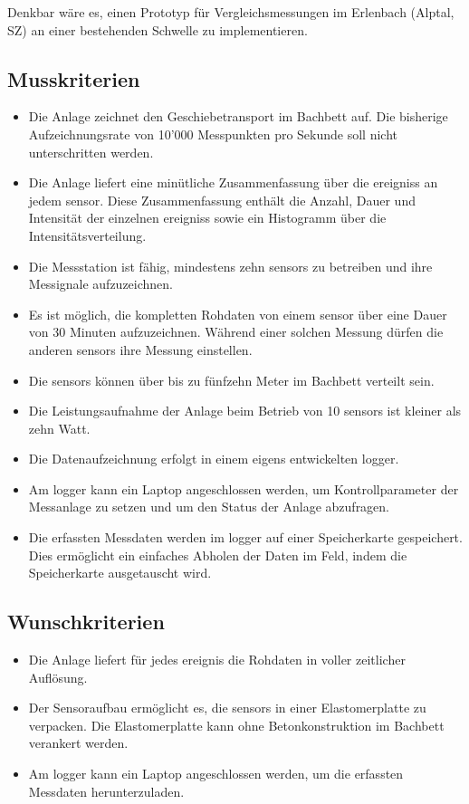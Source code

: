 Denkbar wäre es, einen Prototyp für Vergleichsmessungen im Erlenbach (Alptal, SZ) an einer bestehenden Schwelle zu implementieren.


\subsection{Musskriterien}
\begin{itemize}
\item Die Anlage zeichnet den Geschiebetransport im Bachbett auf. Die bisherige Aufzeichnungsrate von 10'000 Messpunkten pro Sekunde soll nicht unterschritten werden.
\item Die Anlage liefert eine minütliche Zusammenfassung über die \glspl{ereignis} an jedem \gls{sensor}. Diese Zusammenfassung enthält die Anzahl, Dauer und Intensität der einzelnen \glspl{ereignis} sowie ein Histogramm über die Intensitätsverteilung.
\item Die Messstation ist fähig, mindestens zehn \glspl{sensor} zu betreiben und ihre Messignale aufzuzeichnen.
\item Es ist möglich, die kompletten Rohdaten von einem \gls{sensor} über eine Dauer von 30 Minuten aufzuzeichnen. Während einer solchen Messung dürfen die anderen \glspl{sensor} ihre Messung einstellen.
\item Die \glspl{sensor} können über bis zu fünfzehn Meter im Bachbett verteilt sein.
\item Die Leistungsaufnahme der Anlage beim Betrieb von 10 \glspl{sensor} ist kleiner als zehn Watt.
\item Die Datenaufzeichnung erfolgt in einem eigens entwickelten \gls{logger}.
\item Am \gls{logger} kann ein Laptop angeschlossen werden, um Kontrollparameter der Messanlage zu setzen und um den Status der Anlage abzufragen.
\item Die erfassten Messdaten werden im \gls{logger} auf einer Speicherkarte gespeichert. Dies ermöglicht ein einfaches Abholen der Daten im Feld, indem die Speicherkarte ausgetauscht wird.
\end{itemize}
\subsection{Wunschkriterien}
\begin{itemize}
\item Die Anlage liefert für jedes \gls{ereignis} die Rohdaten in voller zeitlicher Auflösung.
\item Der Sensoraufbau ermöglicht es, die \glspl{sensor} in einer Elastomerplatte zu verpacken. Die Elastomerplatte kann ohne Betonkonstruktion im Bachbett verankert werden.
\item Am \gls{logger} kann ein Laptop angeschlossen werden, um die erfassten Messdaten herunterzuladen.
\end{itemize}
